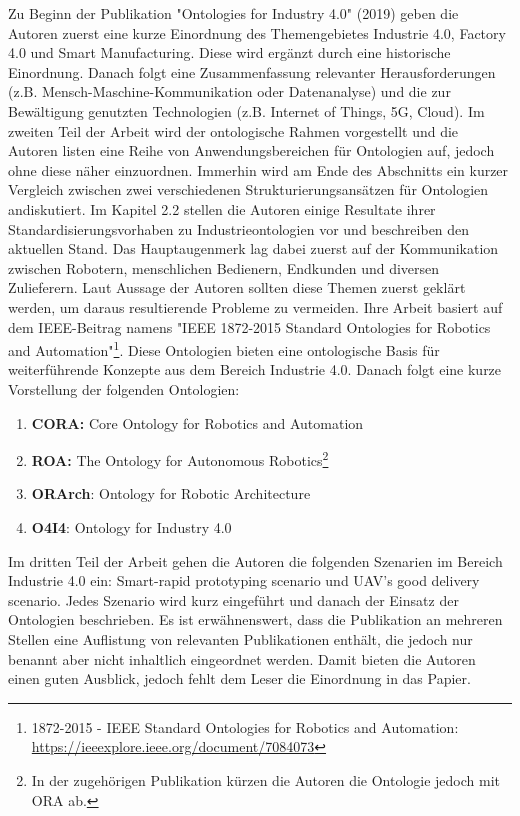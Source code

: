 \documentclass{article}
\begin{document}
Zu Beginn der Publikation "Ontologies for Industry 4.0" \cite{kumar2019ontologies} (2019) geben die Autoren zuerst eine kurze Einordnung des Themengebietes Industrie 4.0, Factory 4.0 und Smart Manufacturing.
Diese wird ergänzt durch eine historische Einordnung.
Danach folgt eine Zusammenfassung relevanter Herausforderungen (z.B. Mensch-Maschine-Kommunikation oder Datenanalyse) und die zur Bewältigung genutzten Technologien (z.B. Internet of Things, 5G, Cloud).
Im zweiten Teil der Arbeit wird der ontologische Rahmen vorgestellt und die Autoren listen eine Reihe von Anwendungsbereichen für Ontologien auf, jedoch ohne diese näher einzuordnen.
Immerhin wird am Ende des Abschnitts ein kurzer Vergleich zwischen zwei verschiedenen Strukturierungsansätzen für Ontologien andiskutiert.
Im Kapitel 2.2 stellen die Autoren einige Resultate ihrer Standardisierungsvorhaben zu Industrieontologien vor und beschreiben den aktuellen Stand.
Das Hauptaugenmerk lag dabei zuerst auf der Kommunikation zwischen Robotern, menschlichen Bedienern, Endkunden und diversen Zulieferern.
Laut Aussage der Autoren sollten diese Themen zuerst geklärt werden, um daraus resultierende Probleme zu vermeiden.
Ihre Arbeit basiert auf dem IEEE-Beitrag namens "IEEE 1872-2015 Standard Ontologies for Robotics and Automation"\footnote{1872-2015 - IEEE Standard Ontologies for Robotics and Automation: \url{https://ieeexplore.ieee.org/document/7084073}}.
Diese Ontologien bieten eine ontologische Basis für weiterführende Konzepte aus dem Bereich Industrie 4.0.
Danach folgt eine kurze Vorstellung der folgenden Ontologien:
\begin{enumerate}
    \item \textbf{CORA:} Core Ontology for Robotics and Automation
    \item \textbf{ROA:} The Ontology for Autonomous Robotics\footnote{In der zugehörigen Publikation\cite{olszewska2017ontology} kürzen die Autoren die Ontologie jedoch mit ORA ab.}
    \item \textbf{ORArch}: Ontology for Robotic Architecture
    \item \textbf{O4I4}: Ontology for Industry 4.0
\end{enumerate}

Im dritten Teil der Arbeit gehen die Autoren die folgenden Szenarien im Bereich Industrie 4.0 ein: Smart-rapid prototyping scenario und UAV’s good delivery scenario.
Jedes Szenario wird kurz eingeführt und danach der Einsatz der Ontologien beschrieben.
Es ist erwähnenswert, dass die Publikation an mehreren Stellen eine Auflistung von relevanten Publikationen enthält, die jedoch nur benannt aber nicht inhaltlich eingeordnet werden. Damit bieten die Autoren einen guten Ausblick, jedoch fehlt dem Leser die Einordnung in das Papier.
\end{document}
